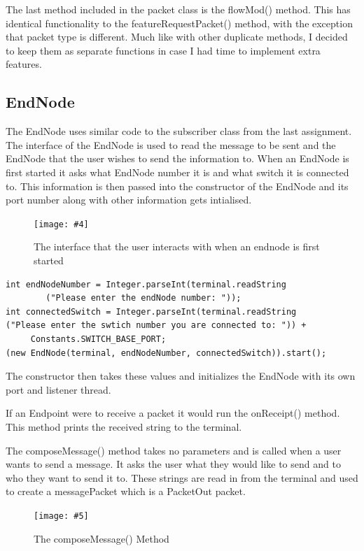 \documentclass{article}
\newcommand{\includescalefigure}[5]{
\begin{figure}[htb]
\centering
\texttt{[image: \#5]}
\captionsetup{width=.8\linewidth} 
\caption[#2]{#3}
\label{#1}
\end{figure}
}
\newcommand{\includefigure}[4]{
\begin{figure}[htb]
\centering
\texttt{[image: \#4]}
\captionsetup{width=.8\linewidth} 
\caption[#2]{#3}
\label{#1}
\end{figure}
}
\begin{document}
The last method included in the packet class is the flowMod() method. This has identical functionality to the featureRequestPacket() method, with the exception that packet type is different. Much like with other duplicate methods, I decided to keep them as separate functions in case I had time to implement extra features.


\subsection{EndNode}

The EndNode uses similar code to the subscriber class from the last assignment. The interface of the EndNode is used to read the message to be sent and the EndNode that the user wishes to send the information to. When an EndNode is first started it asks what EndNode number it is and what switch it is connected to. This information is then passed into the constructor of the EndNode and its port number along with other information gets intialised.

\includefigure{EndNodeIntialisation}{EndNode Intialisation}{The interface that the user interacts with when an endnode is first started}{Endnode-Intialisation.PNG}

\begin{lstlisting}[caption={[Input of Message] Upon intialising the Endnode, the user is being asked to input the Endnode number and the switch it is connected to}]
int endNodeNumber = Integer.parseInt(terminal.readString
		("Please enter the endNode number: "));
int connectedSwitch = Integer.parseInt(terminal.readString
("Please enter the swtich number you are connected to: ")) +
	 Constants.SWITCH_BASE_PORT;
(new EndNode(terminal, endNodeNumber, connectedSwitch)).start();
\end{lstlisting}

The constructor then takes these values and initializes the EndNode with its own port and listener thread.

If an Endpoint were to receive a packet it would run the onReceipt() method. This method prints the received string to the terminal.

The composeMessage() method takes no parameters and is called when a user wants to send a message. It asks the user what they would like to send and to who they want to send it to. These strings are read in from the terminal and used to create a messagePacket  which is a PacketOut packet.

\includescalefigure{ComposeMessageMethod}{EndNode ComposeMessage}{The composeMessage() Method}{0.97}{composeMessage-EndNode.PNG}
\end{document}
